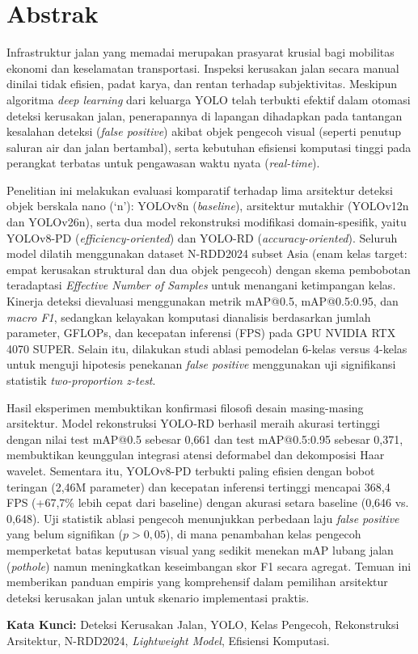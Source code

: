 \chapter*{Abstrak}
Infrastruktur jalan yang memadai merupakan prasyarat krusial bagi mobilitas ekonomi dan keselamatan transportasi. Inspeksi kerusakan jalan secara manual dinilai tidak efisien, padat karya, dan rentan terhadap subjektivitas. Meskipun algoritma \textit{deep learning} dari keluarga YOLO telah terbukti efektif dalam otomasi deteksi kerusakan jalan, penerapannya di lapangan dihadapkan pada tantangan kesalahan deteksi (\textit{false positive}) akibat objek pengecoh visual (seperti penutup saluran air dan jalan bertambal), serta kebutuhan efisiensi komputasi tinggi pada perangkat terbatas untuk pengawasan waktu nyata (\textit{real-time}).

Penelitian ini melakukan evaluasi komparatif terhadap lima arsitektur deteksi objek berskala nano (`n'): YOLOv8n (\textit{baseline}), arsitektur mutakhir (YOLOv12n dan YOLOv26n), serta dua model rekonstruksi modifikasi domain-spesifik, yaitu YOLOv8-PD (\textit{efficiency-oriented}) dan YOLO-RD (\textit{accuracy-oriented}). Seluruh model dilatih menggunakan dataset N-RDD2024 subset Asia (enam kelas target: empat kerusakan struktural dan dua objek pengecoh) dengan skema pembobotan teradaptasi \textit{Effective Number of Samples} untuk menangani ketimpangan kelas. Kinerja deteksi dievaluasi menggunakan metrik mAP@0.5, mAP@0.5:0.95, dan \textit{macro F1}, sedangkan kelayakan komputasi dianalisis berdasarkan jumlah parameter, GFLOPs, dan kecepatan inferensi (FPS) pada GPU NVIDIA RTX 4070 SUPER. Selain itu, dilakukan studi ablasi pemodelan 6-kelas versus 4-kelas untuk menguji hipotesis penekanan \textit{false positive} menggunakan uji signifikansi statistik \textit{two-proportion z-test}.

Hasil eksperimen membuktikan konfirmasi filosofi desain masing-masing arsitektur. Model rekonstruksi YOLO-RD berhasil meraih akurasi tertinggi dengan nilai test mAP@0.5 sebesar 0,661 dan test mAP@0.5:0.95 sebesar 0,371, membuktikan keunggulan integrasi atensi deformabel dan dekomposisi Haar wavelet. Sementara itu, YOLOv8-PD terbukti paling efisien dengan bobot teringan (2,46M parameter) dan kecepatan inferensi tertinggi mencapai 368,4 FPS (+67,7\% lebih cepat dari baseline) dengan akurasi setara baseline (0,646 vs. 0,648). Uji statistik ablasi pengecoh menunjukkan perbedaan laju \textit{false positive} yang belum signifikan ($p > 0,05$), di mana penambahan kelas pengecoh memperketat batas keputusan visual yang sedikit menekan mAP lubang jalan (\textit{pothole}) namun meningkatkan keseimbangan skor F1 secara agregat. Temuan ini memberikan panduan empiris yang komprehensif dalam pemilihan arsitektur deteksi kerusakan jalan untuk skenario implementasi praktis.

\vspace{1em}
\textbf{Kata Kunci:} Deteksi Kerusakan Jalan, YOLO, Kelas Pengecoh, Rekonstruksi Arsitektur, N-RDD2024, \textit{Lightweight Model}, Efisiensi Komputasi.
